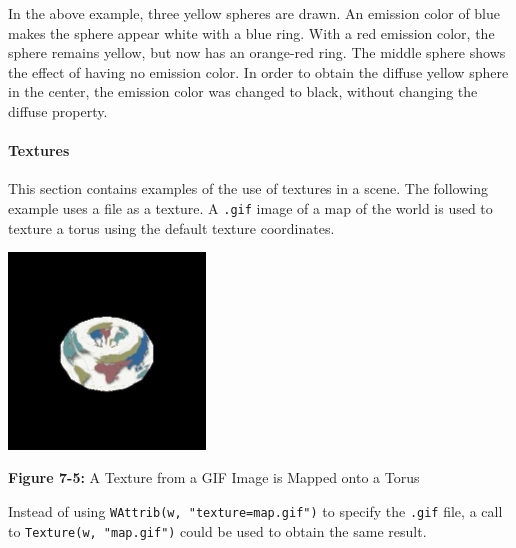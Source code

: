 \bigskip


In the above example, three yellow spheres are drawn. An emission
color of blue makes the sphere appear white with a blue ring. With a
red emission color, the sphere remains yellow, but now has an
orange-red ring. The middle sphere shows the effect of having no
emission color. In order to obtain the diffuse yellow sphere in the
center, the emission color was changed to black, without changing the
diffuse property.

\paragraph{Textures}
This section contains examples of the use of textures in a scene. The
following example uses a file as a texture. A \texttt{.gif} image of a
map of the world is used to texture a torus using the default texture
coordinates.

\bigskip

{\centering 
\includegraphics[width=2.0583in,height=2.0583in]{ub-img/ub-img35.jpg}
\par}

{\sffamily\bfseries Figure 7-5:}
{\sffamily A Texture from a GIF Image is Mapped onto a Torus}


Instead of using \texttt{WAttrib(w, "texture=map.gif")} to specify the
\texttt{.gif} file, a call to \texttt{Texture(w, "map.gif")} could be
used to obtain the same result.

